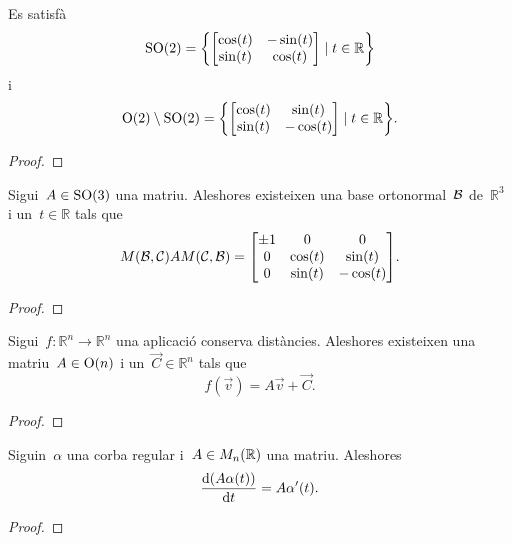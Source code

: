 \documentclass[../../main.tex]{subfiles}
\begin{document}
    \begin{proposition}
        \label{prop:caracterització de les matrius ortogonals 2x2}
        Es satisfà
        \[\GrupEspecialOrtogonal(2)=\left\{\begin{bmatrix}
            \cos(t) & -\sin(t) \\
            \sin(t) & \cos(t)
        \end{bmatrix}\mid t\in\mathbb{R}\right\}\]
        i
        \[\GrupOrtogonal(2)\setminus\GrupEspecialOrtogonal(2)=\left\{\begin{bmatrix}
            \cos(t) & \sin(t) \\
            \sin(t) & -\cos(t)
        \end{bmatrix}\mid t\in\mathbb{R}\right\}.\]
        \begin{proof}
        \end{proof}
    \end{proposition}
    \begin{proposition}
        Sigui~\(A\in\operatorname{SO}(3)\) una matriu.
        Aleshores existeixen una base ortonormal~\(\mathcal{B}\) de~\(\mathbb{R}^{3}\) i un~\(t\in\mathbb{R}\) tals que
        \[M(\base{B},\basecanonica)AM(\basecanonica,\base{B})=\begin{bmatrix}
            \pm1 & 0 & 0 \\
            0 & \cos(t) & \sin(t) \\
            0 & \sin(t) & -\cos(t)
        \end{bmatrix}.\]
        \begin{proof}
        \end{proof}
    \end{proposition}
    \begin{proposition}
        \label{prop:forma matricial de les aplicacions que conserven distàncies}
        Sigui~\(f\colon\mathbb{R}^{n}\longrightarrow\mathbb{R}^{n}\) una aplicació conserva distàncies.
        Aleshores existeixen una matriu~\(A\in\operatorname{O}(n)\) i un~\(\vec{C}\in\mathbb{R}^{n}\) tals que
        \[
            f(\vec{v})=A\vec{v}+\vec{C}.
        \]
        \begin{proof}
        \end{proof}
    \end{proposition}
    \begin{proposition}
        \label{prop:derivada del producte d'una matriu per una corba}
        Siguin~\(\alpha\) una corba regular i~\(A\in M_{n}(\mathbb{R})\) una matriu.
        Aleshores
        \[
            \frac{\mathop{}\!\mathrm{d}(A\alpha(t))}{\mathop{}\!\mathrm{d} t}=A\alpha'(t).
        \]
        \begin{proof}
        \end{proof}
    \end{proposition}
\end{document}
